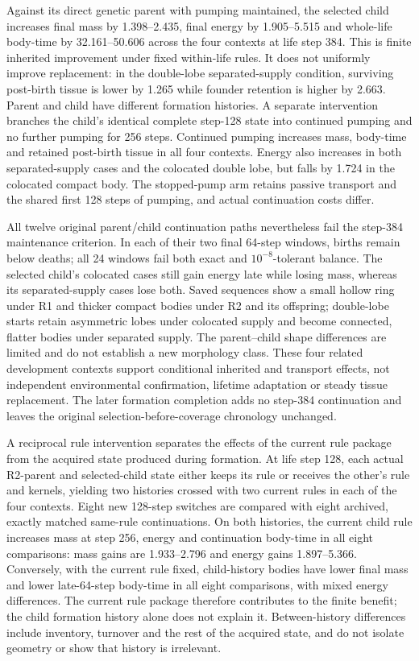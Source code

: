 Against its direct genetic parent with pumping maintained, the selected child increases final mass by 1.398--2.435, final energy by 1.905--5.515 and whole-life body-time by 32.161--50.606 across the four contexts at life step 384. This is finite inherited improvement under fixed within-life rules. It does not uniformly improve replacement: in the double-lobe separated-supply condition, surviving post-birth tissue is lower by 1.265 while founder retention is higher by 2.663. Parent and child have different formation histories. A separate intervention branches the child's identical complete step-128 state into continued pumping and no further pumping for 256 steps. Continued pumping increases mass, body-time and retained post-birth tissue in all four contexts. Energy also increases in both separated-supply cases and the colocated double lobe, but falls by 1.724 in the colocated compact body. The stopped-pump arm retains passive transport and the shared first 128 steps of pumping, and actual continuation costs differ.

All twelve original parent/child continuation paths nevertheless fail the step-384 maintenance criterion. In each of their two final 64-step windows, births remain below deaths; all 24 windows fail both exact and $10^{-8}$-tolerant balance. The selected child's colocated cases still gain energy late while losing mass, whereas its separated-supply cases lose both. Saved sequences show a small hollow ring under R1 and thicker compact bodies under R2 and its offspring; double-lobe starts retain asymmetric lobes under colocated supply and become connected, flatter bodies under separated supply. The parent--child shape differences are limited and do not establish a new morphology class. These four related development contexts support conditional inherited and transport effects, not independent environmental confirmation, lifetime adaptation or steady tissue replacement. The later formation completion adds no step-384 continuation and leaves the original selection-before-coverage chronology unchanged.

A reciprocal rule intervention separates the effects of the current rule package from the acquired state produced during formation. At life step 128, each actual R2-parent and selected-child state either keeps its rule or receives the other's rule and kernels, yielding two histories crossed with two current rules in each of the four contexts. Eight new 128-step switches are compared with eight archived, exactly matched same-rule continuations. On both histories, the current child rule increases mass at step 256, energy and continuation body-time in all eight comparisons: mass gains are 1.933--2.796 and energy gains 1.897--5.366. Conversely, with the current rule fixed, child-history bodies have lower final mass and lower late-64-step body-time in all eight comparisons, with mixed energy differences. The current rule package therefore contributes to the finite benefit; the child formation history alone does not explain it. Between-history differences include inventory, turnover and the rest of the acquired state, and do not isolate geometry or show that history is irrelevant.


